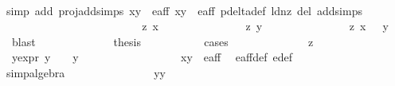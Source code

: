 \begin{isabellebody}
\ \ \ \ \ \ \ \ \ \ \ \ \isamarkupfalse%
{\isacharparenleft}simp\ add{\isacharcolon}\ proj{\isacharunderscore}add{\isachardot}simps\ {\isacartoucheopen}{\isacharparenleft}x{\isacharcomma}y{\isacharparenright}\ {\isasymin}\ e{\isacharunderscore}aff{\isacartoucheclose}\ {\isacartoucheopen}{\isacharparenleft}x{\isacharprime}{\isacharcomma}y{\isacharprime}{\isacharparenright}\ {\isasymin}\ e{\isacharunderscore}aff{\isacartoucheclose}\ p{\isacharunderscore}delta{\isacharunderscore}def\ ld{\isacharunderscore}nz\ del{\isacharcolon}\ add{\isachardot}simps{\isacharparenright}\isanewline
\ \ \ \ \ \ \ \ \ \ \isamarkupfalse%
\ \isanewline
\ \ \ \ \ \ \ \ \ \ \ \ {\isacharparenleft}z{}{\isacharparenright}\ {\isachardoublequoteopen}x\ {\isacharequal}\ {}{\isachardoublequoteclose}\ {\isacharbar}\isanewline
\ \ \ \ \ \ \ \ \ \ \ \ {\isacharparenleft}z{}{\isacharparenright}\ {\isachardoublequoteopen}y\ {\isacharequal}\ {}{\isachardoublequoteclose}\ {\isacharbar}\isanewline
\ \ \ \ \ \ \ \ \ \ \ \ {\isacharparenleft}z{}{\isacharparenright}\ {\isachardoublequoteopen}x\ {\isasymnoteq}\ {}{\isachardoublequoteclose}\ {\isachardoublequoteopen}y\ {\isasymnoteq}\ {}{\isachardoublequoteclose}\ \isamarkupfalse%
\ blast\isanewline
\ \ \ \ \ \ \ \ \ \ \isamarkupfalse%
\ \isamarkupfalse%
\ {\isacharquery}thesis\isanewline
\ \ \ \ \ \ \ \ \ \ \isamarkupfalse%
{\isacharparenleft}cases{\isacharparenright}\isanewline
\ \ \ \ \ \ \ \ \ \ \ \ \isamarkupfalse%
\ z{}\isanewline
\ \ \ \ \ \ \ \ \ \ \ \ \isamarkupfalse%
\ \isamarkupfalse%
\ y{\isacharunderscore}expr{\isacharcolon}\ {\isachardoublequoteopen}y\ {\isacharequal}\ {}\ {\isasymor}\ y\ {\isacharequal}\ {\isacharminus}{}{\isachardoublequoteclose}\isanewline
\ \ \ \ \ \ \ \ \ \ \ \ \ \ \isamarkupfalse%
\ {\isacartoucheopen}{\isacharparenleft}x{\isacharcomma}y{\isacharparenright}\ {\isasymin}\ e{\isacharunderscore}aff{\isacartoucheclose}\ \isamarkupfalse%
\ e{\isacharunderscore}aff{\isacharunderscore}def\ e{\isacharprime}{\isacharunderscore}def\ \isanewline
\ \ \ \ \ \ \ \ \ \ \ \ \ \ \isamarkupfalse%
{\isacharparenleft}simp{\isacharcomma}algebra{\isacharparenright}\isanewline
\ \ \ \ \ \ \ \ \ \ \ \ \isamarkupfalse%
\ \isamarkupfalse%
\ {\isachardoublequoteopen}y{\isacharasterisk}y\ {\isacharequal}\ {}{\isachardoublequoteclose}\ \isamarkupfalse%

\end{isabellebody}
